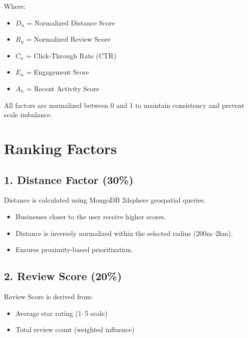 \documentclass[12pt,a4paper]{report}
\begin{document}
Where:

\begin{itemize}

\item $D_n$ = Normalized Distance Score

\item $R_n$ = Normalized Review Score

\item $C_n$ = Click-Through Rate (CTR)

\item $E_n$ = Engagement Score

\item $A_n$ = Recent Activity Score

\end{itemize}

All factors are normalized between 0 and 1 to maintain consistency and prevent scale imbalance.

\section{Ranking Factors}

\subsection{1. Distance Factor (30\%)}

Distance is calculated using MongoDB 2dsphere geospatial queries.

\begin{itemize}

\item Businesses closer to the user receive higher scores.

\item Distance is inversely normalized within the selected radius (200m--2km).

\item Ensures proximity-based prioritization.

\end{itemize}

\subsection{2. Review Score (20\%)}

Review Score is derived from:

\begin{itemize}

\item Average star rating (1--5 scale)

\item Total review count (weighted influence)

\end{itemize}
\end{document}
